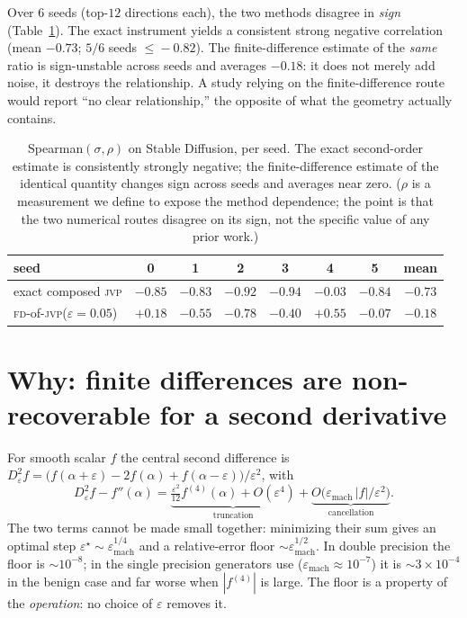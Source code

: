 \documentclass[11pt]{article}
\newcommand{\jvp}{\textsc{jvp}}
\newcommand{\fd}{\textsc{fd}}
\newcommand{\eps}{\varepsilon}
\begin{document}
Over $6$ seeds (top-$12$ directions each), the two methods disagree in
\emph{sign} (Table~\ref{tab:flip}). The exact instrument yields a consistent
strong negative correlation (mean $-0.73$; $5/6$ seeds $\leq\!-0.82$). The
finite-difference estimate of the \emph{same} ratio is sign-unstable across seeds
and averages $-0.18$: it does not merely add noise, it destroys the relationship.
A study relying on the finite-difference route would report ``no clear
relationship,'' the opposite of what the geometry actually contains.

\begin{table}[h]\centering\small
\begin{tabular}{lccccccc}
\toprule
seed & 0 & 1 & 2 & 3 & 4 & 5 & \textbf{mean} \\
\midrule
exact composed \jvp & $-0.85$ & $-0.83$ & $-0.92$ & $-0.94$ & $-0.03$ & $-0.84$ & $\mathbf{-0.73}$ \\
\fd-of-\jvp ($\eps{=}0.05$) & $+0.18$ & $-0.55$ & $-0.78$ & $-0.40$ & $+0.55$ & $-0.07$ & $\mathbf{-0.18}$ \\
\bottomrule
\end{tabular}
\caption{Spearman$(\sigma,\rho)$ on Stable Diffusion, per seed. The exact
second-order estimate is consistently strongly negative; the finite-difference
estimate of the identical quantity changes sign across seeds and averages near
zero. ($\rho$ is a measurement we define to expose the method dependence; the
point is that the two numerical routes disagree on its sign, not the specific
value of any prior work.)}
\label{tab:flip}
\end{table}

\section{Why: finite differences are non-recoverable for a second derivative}
\label{sec:fd}
For smooth scalar $f$ the central second difference is
$D^2_\eps f=\big(f(\alpha+\eps)-2f(\alpha)+f(\alpha-\eps)\big)/\eps^2$, with
\[
D^2_\eps f - f''(\alpha)
=\underbrace{\tfrac{\eps^2}{12}f^{(4)}(\alpha)+O(\eps^4)}_{\text{truncation}}
+\underbrace{O\!\big(\eps_{\mathrm{mach}}\,|f|/\eps^2\big)}_{\text{cancellation}} .
\]
The two terms cannot be made small together: minimizing their sum gives an optimal
step $\eps^\star\sim\eps_{\mathrm{mach}}^{1/4}$ and a relative-error floor
$\sim\eps_{\mathrm{mach}}^{1/2}$. In double precision the floor is $\sim\!10^{-8}$;
in the single precision generators use ($\eps_{\mathrm{mach}}\!\approx\!10^{-7}$)
it is $\sim\!3\times10^{-4}$ in the benign case and far worse when $|f^{(4)}|$ is
large. The floor is a property of the \emph{operation}: no choice of $\eps$
removes it.
\end{document}
